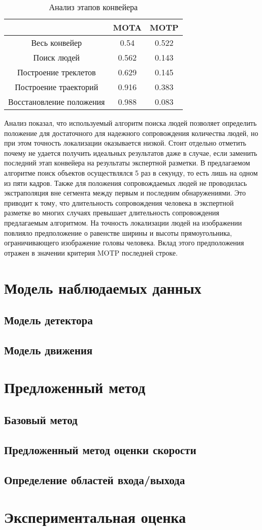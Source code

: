 \begin{table}[h]
	\caption{Анализ этапов конвейера} \label{sec::tracking:tab::ceiling_analysis} \centering
	\begin{tabular}{|c|c|c|}
		\hline
		 & MOTA & MOTP\\
		\hline \hline
		Весь конвейер & 0.54 & 0.522 \\ \hline
		Поиск людей & 0.562 & 0.143 \\ \hline
		Построение треклетов & 0.629 & 0.145 \\ \hline
		Построение траекторий & 0.916 & 0.383 \\ \hline
		Восстановление положения & 0.988 & 0.083 \\ \hline
	\end{tabular}
\end{table}

Анализ показал, что используемый алгоритм поиска людей позволяет определить положение для достаточного для надежного сопровождения количества людей, но при этом точность локализации оказывается низкой. Стоит отдельно отметить почему не удается получить идеальных результатов даже в случае, если заменить последний этап конвейера на результаты экспертной разметки. В предлагаемом алгоритме поиск объектов осуществлялся 5 раз в секунду, то есть лишь на одном из пяти кадров. Также для положения сопровождаемых людей не проводилась экстраполяция вне сегмента между первым и последним обнаружениями. Это приводит к тому, что длительность сопровождения человека в  экспертной разметке во многих случаях превышает длительность сопровождения предлагаемым алгоритмом. На точность локализации людей на изображении повлияло предположение о равенстве ширины и высоты прямоугольника, ограничивающего изображение головы человека. Вклад этого предположения отражен в значении критерия MOTP последней строке.

\section{Модель наблюдаемых данных}
\subsection{Модель детектора}
\subsection{Модель движения}
\section{Предложенный метод}
\subsection{Базовый метод}
\subsection{Предложенный метод оценки скорости}
\subsection{Определение областей входа/выхода}
\section{Экспериментальная оценка}
